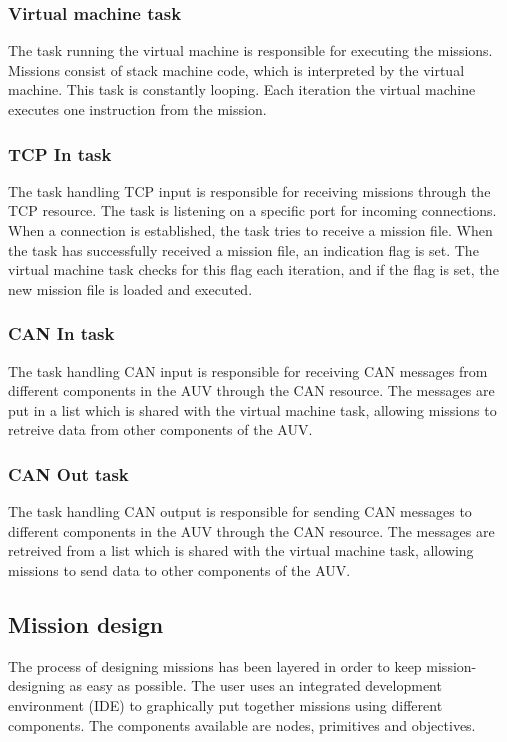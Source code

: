 \subsubsection{Virtual machine task}
The task running the virtual machine is responsible for executing the missions. Missions consist of stack machine code, which is interpreted by the virtual machine. This task is constantly looping. Each iteration the virtual machine executes one instruction from the mission.

\subsubsection{TCP In task}
The task handling TCP input is responsible for receiving missions through the TCP resource. The task is listening on a specific port for incoming connections. When a connection is established, the task tries to receive a mission file. When the task has successfully received a mission file, an indication flag is set. The virtual machine task checks for this flag each iteration, and if the flag is set, the new mission file is loaded and executed.

\subsubsection{CAN In task}
The task handling CAN input is responsible for receiving CAN messages from different components in the AUV through the CAN resource. The messages are put in a list which is shared with the virtual machine task, allowing missions to retreive data from other components of the AUV.

\subsubsection{CAN Out task}
The task handling CAN output is responsible for sending CAN messages to different components in the AUV through the CAN resource. The messages are retreived from a list which is shared with the virtual machine task, allowing missions to send data to other components of the AUV.

\subsection{Mission design}
The process of designing missions has been layered in order to keep mission-designing as easy as possible. The user uses an integrated development environment (IDE) to graphically put together missions using different components. The components available are nodes, primitives and objectives.

